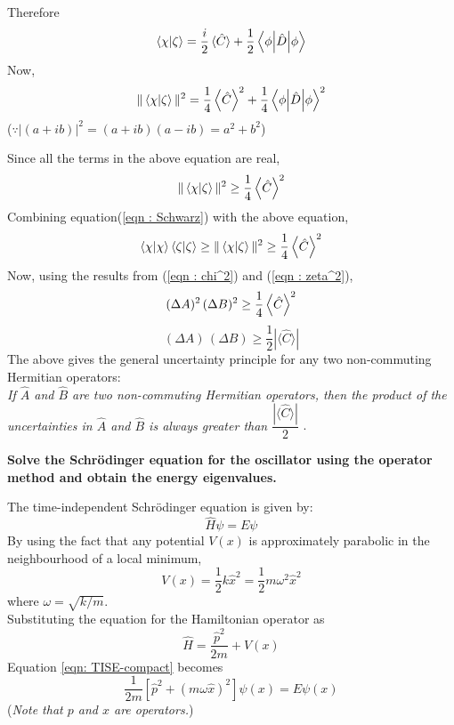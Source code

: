 \documentclass[12pt,a4paper,answers]{exam}
\newcommand{\p}{\hat{p}}
\newcommand{\x}{\hat{x}}
\newcommand{\A}{\hat{A}}
\newcommand{\B}{\hat{B}}
\newcommand{\C}{\hat{C}}
\begin{document}
\begin{questions}
\begin{solutionorbox}
		Therefore
	 	\begin{equation}
	 		\braket{\chi}{\zeta} = \dfrac{i}{2}\ev**{\C} + \dfrac{1}{2} \ev**{\hat{D}}{\phi}
	 	\end{equation}
	 	Now,
	 	\begin{equation}\label{}
	 		\| \braket{\chi}{\zeta} \|^2 = \dfrac{1}{4} \ev{\C}^2 + \dfrac{1}{4} \ev**{\hat{D}}{\phi} ^2
	 	\end{equation}
	 	($ \because |(a+ib)|^2 = (a+ib)(a-ib) = a^2 + b^2 $)
	 	
	 	Since all the terms in the above equation are real, 
	 	\begin{equation}
	 		\| \braket{\chi}{\zeta} \|^2 \geq \dfrac{1}{4} \ev{\C}^2 
	 	\end{equation}
	 	Combining equation(\ref{eqn : Schwarz}) with the above equation,
	 	\[ \braket{\chi} \braket{\zeta} \geq \| \braket{\chi}{\zeta}\|^2  \geq \dfrac{1}{4} \ev{\C}^2  \]
	 	Now, using the results from (\ref{eqn : chi^2}) and (\ref{eqn : zeta^2}),
	 	\begin{equation}
			(\Delta A)^{2}\, (\Delta B)^{2} \geq \dfrac{1}{4}\expval{\C}^2
	 	\end{equation}
	 	\begin{equation}
	 		\boxed{(\Delta A)\, (\Delta B) \geq \dfrac{1}{2}|\langle\C\rangle|}
	 	\end{equation}
	 	The above gives the general uncertainty principle for any two non-commuting Hermitian operators:\\
	 	\emph{If $\A$ and $ \B $ are two non-commuting Hermitian operators, then the product of the uncertainties in $ \A $ and $ \B $ is always greater than $ \dfrac{|\langle\C\rangle|}{2} $ }.
	\end{solutionorbox}
	\newpage
	\setcounter{question}{11}
	\question	\textbf{Solve the Schr{\"o}dinger equation for the oscillator using the operator method and obtain the energy eigenvalues.}
	
	\begin{solutionorbox}
		The time-independent Schr{\"o}dinger equation is given by:
		\begin{equation}\label{eqn: TISE-compact}
			\hat{H}\psi = E\psi
		\end{equation}
		By using the fact that any potential $ V(x) $ is approximately parabolic in the neighbourhood of a local minimum,
		\[ V(x) = \dfrac{1}{2} k\x^2 = \dfrac{1}{2} m\omega^2 \x^2 \]
		where $ \omega = \sqrt{k/m} $.\\
		Substituting the equation for the Hamiltonian operator as 
		\[ \hat{H} = \dfrac{\p^2}{2m} + V(x) \] 
		Equation \ref{eqn: TISE-compact} becomes
		\begin{equation} \label{eqn : first-schro}
			\dfrac{1}{2m}\left[ \p^2 + \left(m\omega \x\right)^2  \right]\psi(x) = E \psi(x)
		\end{equation}
		(\textit{Note that $ p $ and $ x $ are operators.})
		

\end{solutionorbox}
\end{questions}
\end{document}
